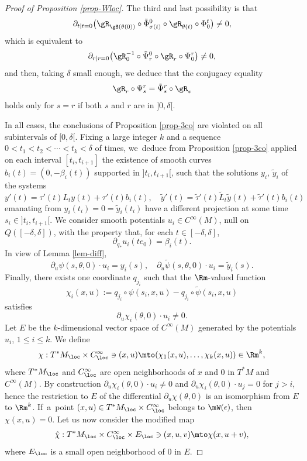 \begin{proof}[Proof of Proposition \ref{prop-Wloc}]
The third and last possibility is that
\[
\partial_{t|t=0} \big(\gR_{\gS(\theta(0))}\circ\tilde \Phi_{\sigma(t)}^0\circ\gR_{\theta(t)}\circ \Phi_0^t\big) \neq 0,
\]
which is equivalent to
\[
\partial_{r|r=0} \big(\gR_0^{-1}\circ \tilde \Psi_r^0\circ\gR_{r}\circ \Psi_0^r\big) \neq 0,
\]
and then, taking $\delta$ small enough, we deduce that the
conjugacy equality
\[
\gR_{r}\circ \Psi_s^r= \tilde \Psi_s^r\circ \gR_{s}
\]
holds only for $s= r$ if both $s$ and $r$ are in $]0, \delta[$.

In all cases, the conclusions of Proposition \ref{prop-3co} are violated on all subintervals of $[0, \delta[$.
Fixing a large integer $k$ and a sequence $0<t_1< t_2 < \cdots <t_k<\delta$ of times, we~deduce from
Proposition \ref{prop-3co} applied on each interval $[t_i, t_{i+1}]$ the existence of smooth curves
$b_i(t)=(0, -\beta_i(t))$ supported in
$]t_i, t_{i+1}[$, such that the solutions $y_i$, $\tilde y_i$ of the systems
\[
y'(t)=\tau'(t)L_ty(t)+\tau'(t)b_i(t), \quad
\tilde y'(t)=\tilde \tau '(t)\tilde L_t\tilde y(t)+\tilde \tau'(t) b_i(t)
\]
emanating from $y_i(t_i)\!=\!0\!=\!\tilde y_i(t_i)$ have a different projection at some time $s_i\!\in\!{}]t_i, t_{i+1}[$.
We consider smooth potentials $u_i\in C^{\infty}(M)$, null on $Q([-\delta, \delta])$, with the property that,
for each $t\in [-\delta, \delta]$,
\[
\partial_{q_*} u_i(te_0)=\beta_i(t).
\]
In view of Lemma \ref{lem-diff},
\[
\partial_u \psi (s,\theta,0)\cdot u_i = y_i(s),\quad
\partial_u \tilde \psi (s,\theta,0)\cdot u_i = \tilde y_i(s).
\]
Finally, there exists one coordinate $q_{j_i}$ such that the $\Rm$-valued function
\[
\chi_i(x,u):=q_{j_i}\circ\psi(s_i,x,u)-q_{j_i}\circ \tilde \psi(s_i,x,u)
\]
satisfies
\[
\partial_u \chi_i(\theta,0)\cdot u_i \neq 0.
\]
Let $E$ be the $k$-dimensional vector space of $C^{\infty}(M)$ generated by the potentials $u_i$, $1\leq i \leq k$. We define
\[
\chi: T^*M_{\loc}\times C^{\infty}_{\loc}\ni(x,u)\mto (\chi_1(x,u), \ldots, \chi_k(x,u))\in \Rm^k,
\]
where $T^*M_{\loc}$ and $ C^{\infty}_{\loc}$ are open neighborhoods of $x$ and $0$ in $T^*M$ and $C^{\infty}(M)$.
By construction
$
\partial_u \chi_i(\theta,0)\cdot u_i \neq 0$
and
$
\partial_u \chi_i(\theta,0)\cdot u_j = 0$ for $j >i$, hence
the restriction to $E$ of the differential $\partial_u\chi (\theta,0)$ is an isomorphism from $E$ to $\Rm^k$.
If~a~point $(x,u)\in T^*M_{\loc}\times C^{\infty}_{\loc}$ belongs to $\mW(\epsilon)$, then $\chi(x,u)=0$.
Let us now consider the modified map
\[
\hat \chi:T^*M_{\loc}\times C^{\infty}_{\loc}\times E_{\loc} \ni (x,u,v)\mto \chi(x,u+v),
\]
where $E_{\loc}$ is a small open neighborhood of $0$ in $E$.

\end{proof}
